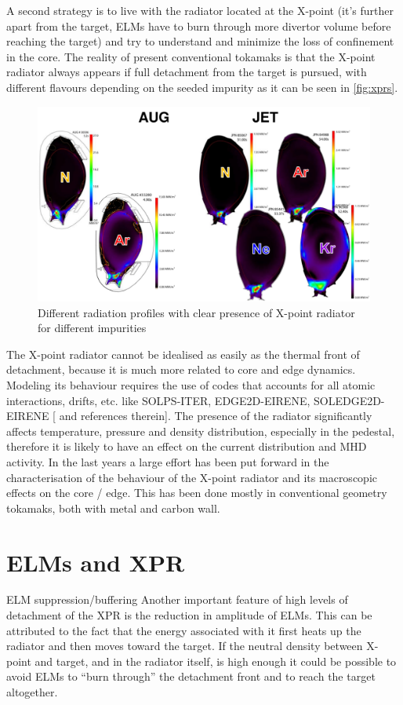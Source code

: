 A second strategy is to live with the radiator located at the X-point (it’s further apart from the target, ELMs have to burn through more divertor volume before reaching the target) and try to understand and minimize the loss of confinement in the core. The reality of present conventional tokamaks is that the X-point radiator always appears if full detachment from the target is pursued, with different flavours depending on the seeded impurity as it can be seen in \autoref{fig:xprs}.

\begin{figure}
	\centering
	\includegraphics[width=\linewidth]{Chapters/chapter1/figs/xprs.png}
	\caption{Different radiation profiles with clear presence of X-point radiator for different impurities
	\cite{Wiesen2017}}
	\label{fig:xprs}
\end{figure}

The X-point radiator cannot be idealised as easily as the thermal front of detachment, because it is much more related to core and edge dynamics. Modeling its behaviour requires the use of codes that accounts for all atomic interactions, drifts, etc. like SOLPS-ITER, EDGE2D-EIRENE, SOLEDGE2D-EIRENE [\cite{Wiesen2017a} and references therein]. The presence of the radiator significantly affects temperature, pressure and density distribution, especially in the pedestal, therefore it is likely to have an effect on the current distribution and MHD activity.
In the last years a large effort has been put forward in the characterisation of the behaviour of the X-point radiator and its macroscopic effects on the core / edge. This has been done mostly in conventional geometry tokamaks, both with metal and carbon wall.


\section{ELMs and XPR}
ELM suppression/buffering
Another important feature of high levels of detachment of the XPR is the reduction in amplitude of ELMs. This can be attributed to the fact that the energy associated with it first heats up the radiator and then moves toward the target. If the neutral density between X-point and target, and in the radiator itself, is high enough it could be possible to avoid ELMs to “burn through” the detachment front and to reach the target altogether. \cite{Krasheninnikov2016}







